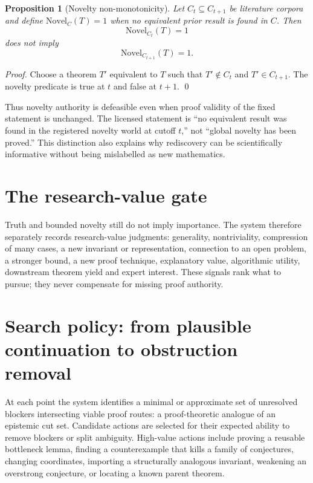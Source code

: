 \documentclass[11pt]{article}
\newtheorem{proposition}{Proposition}
\begin{document}
\begin{proposition}[Novelty non-monotonicity]
Let $C_t\subseteq C_{t+1}$ be literature corpora and define $\mathrm{Novel}_{C}(T)=1$ when no equivalent prior result is found in $C$. Then
\[
\mathrm{Novel}_{C_t}(T)=1
\]
does not imply
\[
\mathrm{Novel}_{C_{t+1}}(T)=1.
\]
\end{proposition}

\begin{proof}
Choose a theorem $T'$ equivalent to $T$ such that $T'\notin C_t$ and $T'\in C_{t+1}$. The novelty predicate is true at $t$ and false at $t+1$. \qed
\end{proof}

Thus novelty authority is defeasible even when proof validity of the fixed statement is unchanged. The licensed statement is ``no equivalent result was found in the registered novelty world at cutoff $t$,'' not ``global novelty has been proved.'' This distinction also explains why rediscovery can be scientifically informative without being mislabelled as new mathematics.

\section{The research-value gate}

Truth and bounded novelty still do not imply importance. The system therefore separately records research-value judgments: generality, nontriviality, compression of many cases, a new invariant or representation, connection to an open problem, a stronger bound, a new proof technique, explanatory value, algorithmic utility, downstream theorem yield and expert interest. These signals rank what to pursue; they never compensate for missing proof authority.

\section{Search policy: from plausible continuation to obstruction removal}

At each point the system identifies a minimal or approximate set of unresolved blockers intersecting viable proof routes: a proof-theoretic analogue of an epistemic cut set. Candidate actions are selected for their expected ability to remove blockers or split ambiguity. High-value actions include proving a reusable bottleneck lemma, finding a counterexample that kills a family of conjectures, changing coordinates, importing a structurally analogous invariant, weakening an overstrong conjecture, or locating a known parent theorem.
\end{document}
